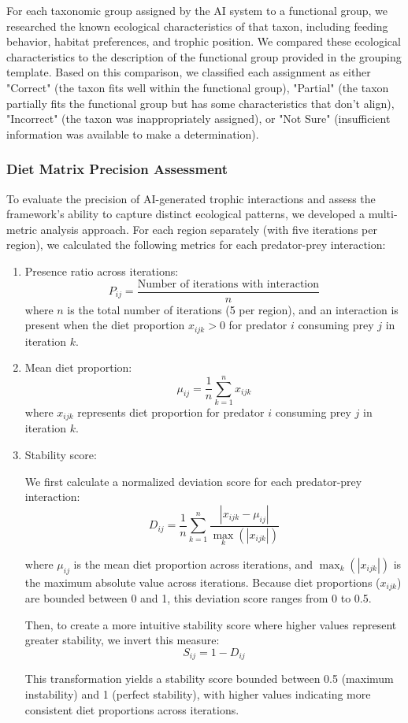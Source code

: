 For each taxonomic group assigned by the AI system to a functional group, we researched the known ecological characteristics of that taxon, including feeding behavior, habitat preferences, and trophic position. We compared these ecological characteristics to the description of the functional group provided in the grouping template. Based on this comparison, we classified each assignment as either "Correct" (the taxon fits well within the functional group), "Partial" (the taxon partially fits the functional group but has some characteristics that don't align), "Incorrect" (the taxon was inappropriately assigned), or "Not Sure" (insufficient information was available to make a determination).


\subsubsection{Diet Matrix Precision Assessment}
To evaluate the precision of AI-generated trophic interactions and assess the framework's ability to capture distinct ecological patterns, we developed a multi-metric analysis approach. For each region separately (with five iterations per region), we calculated the following metrics for each predator-prey interaction:

\begin{enumerate}
    \item Presence ratio across iterations:
    \[
    P_{ij} = \frac{\text{Number of iterations with interaction}}{n}
    \]
    where $n$ is the total number of iterations (5 per region), and an interaction is present when the diet proportion $x_{ijk} > 0$ for predator $i$ consuming prey $j$ in iteration $k$.

    \item Mean diet proportion:
    \[
    \mu_{ij} = \frac{1}{n}\sum_{k=1}^{n} x_{ijk}
    \]
    where $x_{ijk}$ represents diet proportion for predator $i$ consuming prey $j$ in iteration $k$.

    \item Stability score:
    
    We first calculate a normalized deviation score for each predator-prey interaction:
    \[
    D_{ij} = \frac{1}{n}\sum_{k=1}^{n} \frac{|x_{ijk} - \mu_{ij}|}{\max_{k}(|x_{ijk}|)}
    \]
    
    where $\mu_{ij}$ is the mean diet proportion across iterations, and $\max_{k}(|x_{ijk}|)$ is the maximum absolute value across iterations. Because diet proportions ($x_{ijk}$) are bounded between 0 and 1, this deviation score ranges from 0 to 0.5.
    
    Then, to create a more intuitive stability score where higher values represent greater stability, we invert this measure:
    \[
    S_{ij} = 1 - D_{ij}
    \]
    
    This transformation yields a stability score bounded between 0.5 (maximum instability) and 1 (perfect stability), with higher values indicating more consistent diet proportions across iterations.
\end{enumerate}

